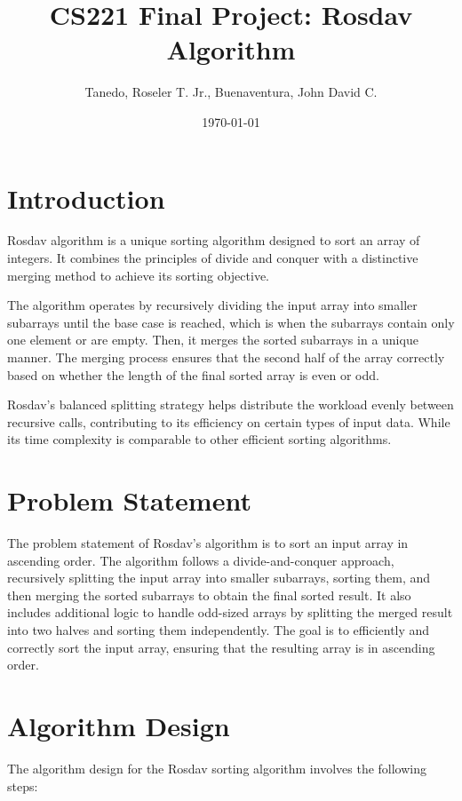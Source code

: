 \documentclass[12pt]{article}
\title{CS221 Final Project: Rosdav Algorithm}
\author{Tanedo, Roseler T. Jr., Buenaventura, John David C.}
\date{\today}
\begin{document}
\maketitle

\section{Introduction}

Rosdav algorithm is a unique sorting algorithm designed to sort an array of integers. It combines the principles of divide and conquer with a distinctive merging method to achieve its sorting objective.

The algorithm operates by recursively dividing the input array into smaller subarrays until the base case is reached, which is when the subarrays contain only one element or are empty. Then, it merges the sorted subarrays in a unique manner. The merging process ensures that the second half of the array correctly based on whether the length of the final sorted array is even or odd.

Rosdav's balanced splitting strategy helps distribute the workload evenly between recursive calls, contributing to its efficiency on certain types of input data. While its time complexity is comparable to other efficient sorting algorithms.

\section{Problem Statement}

The problem statement of Rosdav's algorithm is to sort an input array in ascending order. The algorithm follows a divide-and-conquer approach, recursively splitting the input array into smaller subarrays, sorting them, and then merging the sorted subarrays to obtain the final sorted result. It also includes additional logic to handle odd-sized arrays by splitting the merged result into two halves and sorting them independently. The goal is to efficiently and correctly sort the input array, ensuring that the resulting array is in ascending order.

\section{Algorithm Design}



The algorithm design for the Rosdav sorting algorithm involves the following steps:
\end{document}
